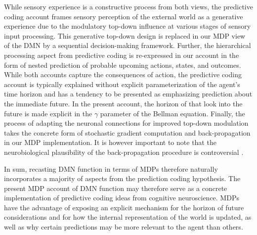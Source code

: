 \documentclass[10pt,letterpaper]{article}
\newcommand{\suggestremove}[1]{{\color{red} \sout{#1}}}
\begin{document}
While sensory experience is a constructive process from both views,
the predictive coding account frames
sensory perception of the external world
as a generative experience due to the modulatory top-down influence at
various stages of sensory input processing.
This generative top-down design is replaced in our MDP view of the DMN
by a sequential decision-making framework.
Further,
the hierarchical processing aspect from predictive coding
is re-expressed in our account in the form of
nested prediction of probable upcoming actions, states, and outcomes.
While both accounts capture the consequences of action,
the predictive coding account is typically explained without
explicit parameterization of the agent's time horizon and
has a tendency to be presented as emphasizing prediction about the
immediate future.
In the present account, the horizon of that
look into the future is made explicit in the $\gamma$ parameter
of the Bellman equation.
Finally,
the process of adapting the neuronal connections
for improved top-down modulation
takes the concrete form of stochastic gradient computation and
back-propagation in our MDP implementation.
It is however important to note that
the neurobiological plausibility of
the back-propagation procedure is controversial
\citep{goodfellow2016deep}.


In sum,
recasting DMN function in terms of MDPs therefore naturally incorporates
a majority of aspects from the prediction coding hypothesis.
The present MDP account of DMN function may therefore
serve as a concrete implementation of
predictive coding ideas from cognitive neuroscience.
MDPs have the advantage of exposing an explicit
mechanism for the horizon of future considerations and for
how the internal representation of the world is updated,
as well as
why certain predictions may be more relevant to the agent than others.
\end{document}
